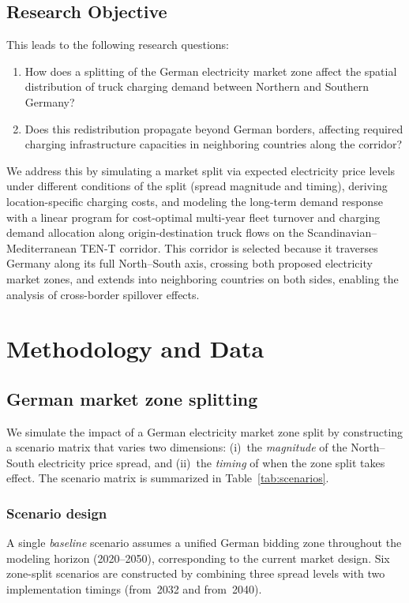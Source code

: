 \documentclass[conference]{IEEEtran}
\begin{document}
\subsection{Research Objective}
This leads to the following research questions: 
\begin{enumerate}
    \item How does a splitting of the German electricity market zone affect the spatial distribution of truck charging demand between Northern and Southern Germany?
    \item Does this redistribution propagate beyond German borders, affecting required charging infrastructure capacities in neighboring countries along the corridor?
\end{enumerate}
We address this by simulating a market split via expected electricity price levels under different conditions of the split (spread magnitude and timing), deriving location-specific charging costs, and modeling the long-term demand response with a linear program for cost-optimal multi-year fleet turnover and charging demand allocation along origin-destination truck flows on the Scandinavian--Mediterranean TEN-T corridor. This corridor is selected because it traverses Germany along its full North--South axis, crossing both proposed electricity market zones, and extends into neighboring countries on both sides, enabling the analysis of cross-border spillover effects.

\section{Methodology and Data}

\subsection{German market zone splitting}

We simulate the impact of a German electricity market zone split by constructing a scenario matrix that varies two dimensions: (i)~the \emph{magnitude} of the North--South electricity price spread, and (ii)~the \emph{timing} of when the zone split takes effect. The scenario matrix is summarized in Table~\ref{tab:scenarios}.

\subsubsection{Scenario design}
A single \emph{baseline} scenario assumes a unified German bidding zone throughout the modeling horizon (2020--2050), corresponding to the current market design. Six zone-split scenarios are constructed by combining three spread levels with two implementation timings (from~2032 and from~2040).
\end{document}
